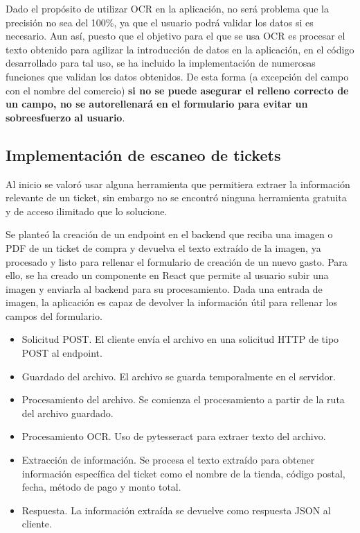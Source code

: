 Dado el propósito de utilizar OCR en la aplicación, no será problema que la precisión no sea del 100\%, ya que el usuario podrá validar los datos si es necesario. Aun así, puesto que el objetivo para el que se usa OCR es procesar el texto obtenido para agilizar la introducción de datos en la aplicación, en el código desarrollado para tal uso, se ha incluido la implementación de numerosas funciones que validan los datos obtenidos. De esta forma (a excepción del campo con el nombre del comercio) \textbf{si no se puede asegurar el relleno correcto de un campo, no se autorellenará en el formulario para evitar un sobreesfuerzo al usuario}.



\subsection{Implementación de escaneo de tickets}
Al inicio se valoró usar alguna herramienta que permitiera extraer la información relevante de un ticket, sin embargo no se encontró ninguna herramienta gratuita y de acceso ilimitado que lo solucione. 

Se planteó la creación de un endpoint en el backend que reciba una imagen o PDF de un ticket de compra y devuelva el texto extraído de la imagen, ya procesado y listo para rellenar el formulario de creación de un nuevo gasto. Para ello, se ha creado un componente en React que permite al usuario subir una imagen y enviarla al backend para su procesamiento. Dada una entrada de imagen, la aplicación es capaz de devolver la información útil para rellenar los campos del formulario.

\begin{itemize}
    \item Solicitud POST. El cliente envía el archivo en una solicitud HTTP de tipo POST al endpoint.
    \item Guardado del archivo. El archivo se guarda temporalmente en el servidor.
    \item Procesamiento del archivo. Se comienza el procesamiento a partir de la ruta del archivo guardado.
    \item Procesamiento OCR. Uso de pytesseract para extraer texto del archivo.
    \item Extracción de información. Se procesa el texto extraído para obtener información específica del ticket como el nombre de la tienda, código postal, fecha, método de pago y monto total.
    \item Respuesta. La información extraída se devuelve como respuesta JSON al cliente.
\end{itemize}

